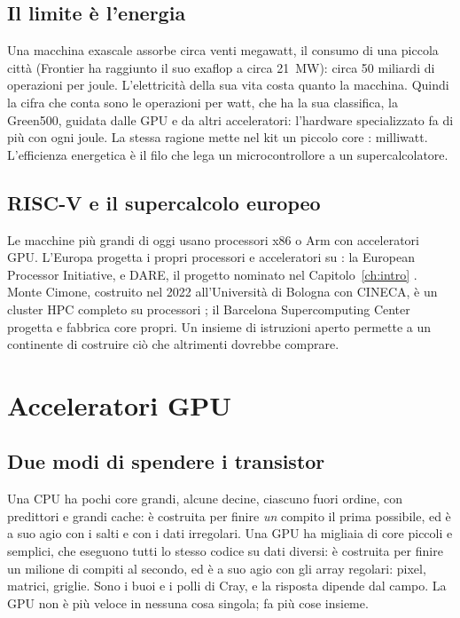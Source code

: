 \subsection{Il limite è l'energia}

Una macchina exascale assorbe circa venti megawatt, il consumo di una piccola
città (Frontier ha raggiunto il suo exaflop a circa 21~MW): circa 50 miliardi
di operazioni per joule. L'elettricità della sua vita costa quanto la macchina.
Quindi la cifra che conta sono le operazioni per watt, che ha la sua
classifica, la Green500, guidata dalle GPU e da altri acceleratori: l'hardware
specializzato fa di più con ogni joule. La stessa ragione mette nel kit un
piccolo core \riscv: milliwatt. L'efficienza energetica è il filo che lega un
microcontrollore a un supercalcolatore.

\subsection{RISC-V e il supercalcolo europeo}

Le macchine più grandi di oggi usano processori x86 o Arm con acceleratori
GPU. L'Europa progetta i propri processori e acceleratori su \riscv: la
European Processor Initiative, e DARE, il progetto nominato nel
Capitolo~\ref{ch:intro} \citep{eurohpcdare}. Monte Cimone, costruito nel 2022
all'Università di Bologna con CINECA, è un cluster HPC completo su processori
\riscv; il Barcelona Supercomputing Center progetta e fabbrica core \riscv
propri. Un insieme di istruzioni aperto permette a un continente di costruire
ciò che altrimenti dovrebbe comprare.

\section{Acceleratori GPU}

\subsection{Due modi di spendere i transistor}

Una CPU ha pochi core grandi, alcune decine, ciascuno fuori ordine, con
predittori e grandi cache: è costruita per finire \emph{un} compito il prima
possibile, ed è a suo agio con i salti e con i dati irregolari. Una GPU ha
migliaia di core piccoli e semplici, che eseguono tutti lo stesso codice su
dati diversi: è costruita per finire un milione di compiti al secondo, ed è a
suo agio con gli array regolari: pixel, matrici, griglie. Sono i buoi e i polli
di Cray, e la risposta dipende dal campo. La GPU non è più veloce in nessuna
cosa singola; fa più cose insieme.

